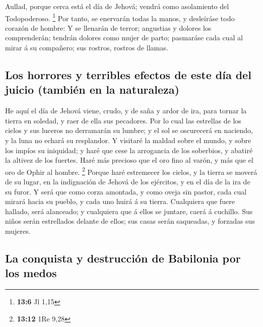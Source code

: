  Aullad, porque cerca está el día de Jehová; vendrá como
asolamiento del Todopoderoso. \footnote{\textbf{13:6} Jl 1,15}
 Por tanto, se enervarán todas la manos, y desleiráse todo
corazón de hombre:  Y se llenarán de terror; angustias y
dolores los comprenderán; tendrán dolores como mujer de parto; pasmaráse
cada cual al mirar á su compañero; sus rostros, rostros de llamas.

\hypertarget{los-horrores-y-terribles-efectos-de-este-duxeda-del-juicio-tambiuxe9n-en-la-naturaleza}{%
\subsection{Los horrores y terribles efectos de este día del juicio
(también en la
naturaleza)}\label{los-horrores-y-terribles-efectos-de-este-duxeda-del-juicio-tambiuxe9n-en-la-naturaleza}}

 He aquí el día de Jehová viene, crudo, y de saña y ardor
de ira, para tornar la tierra en soledad, y raer de ella sus pecadores.
 Por lo cual las estrellas de los cielos y sus luceros no
derramarán su lumbre; y el sol se oscurecerá en naciendo, y la luna no
echará su resplandor.  Y visitaré la maldad sobre el
mundo, y sobre los impíos su iniquidad; y haré que cese la arrogancia de
los soberbios, y abatiré la altivez de los fuertes.  Haré
más precioso que el oro fino al varón, y más que el oro de Ophir al
hombre. \footnote{\textbf{13:12} 1Re 9,28}  Porque haré
estremecer los cielos, y la tierra se moverá de su lugar, en la
indignación de Jehová de los ejércitos, y en el día de la ira de su
furor.  Y será que como corza amontada, y como oveja sin
pastor, cada cual mirará hacia su pueblo, y cada uno huirá á su tierra.
 Cualquiera que fuere hallado, será alanceado; y
cualquiera que á ellos se juntare, caerá á cuchillo.  Sus
niños serán estrellados delante de ellos; sus casas serán saqueadas, y
forzadas sus mujeres.

\hypertarget{la-conquista-y-destrucciuxf3n-de-babilonia-por-los-medos}{%
\subsection{La conquista y destrucción de Babilonia por los
medos}\label{la-conquista-y-destrucciuxf3n-de-babilonia-por-los-medos}}

